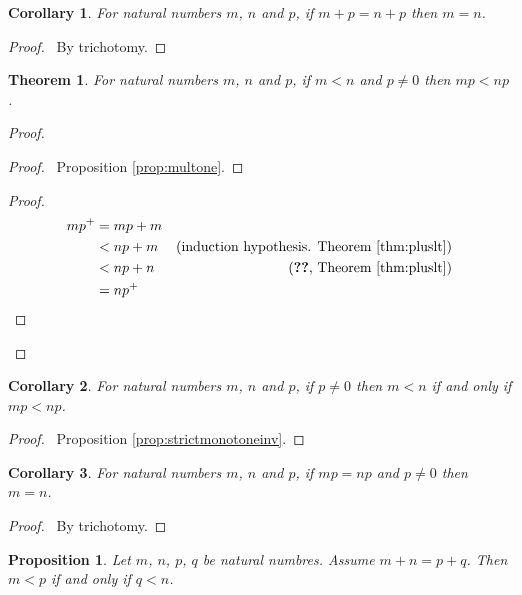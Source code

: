 \documentclass{book}
\let\qed\relax
\newtheorem{prop}[ax]{Proposition}
\newtheorem{cor}{Corollary}[ax]
\newtheorem{thm}[ax]{Theorem}
\theoremstyle{definition}
\begin{document}
\begin{cor}
\label{cor:pluscancel}
For natural numbers $m$, $n$ and $p$, if $m + p = n + p$ then $m = n$.
\end{cor}

\begin{proof}
\pf\ By trichotomy. \qed
\end{proof}

\begin{thm}
For natural numbers $m$, $n$ and $p$, if $m < n$ and $p \neq 0$ then $mp < np$.
\end{thm}

\begin{proof}
\pf
{}
\begin{proof}
	\pf\ Proposition \ref{prop:multone}.
\end{proof}
\begin{proof}
	\pf
	\begin{align*}
		mp^+ & = mp + m \\
		& < np + m & (\text{induction hypothesis. Theorem \ref{thm:pluslt}}) \\
		& < np + n & (\text{\stepref{2}, Theorem \ref{thm:pluslt}}) \\
		& = np^+
	\end{align*}
\end{proof}
\qed
\end{proof}

\begin{cor}
For natural numbers $m$, $n$ and $p$, if $p \neq 0$ then $m < n$ if and only if $mp < np$.
\end{cor}

\begin{proof}
	\pf\ Proposition \ref{prop:strictmonotoneinv}. \qed
\end{proof}

\begin{cor}
For natural numbers $m$, $n$ and $p$, if $mp = np$ and $p \neq 0$ then $m = n$.
\end{cor}

\begin{proof}
	\pf\ By trichotomy. \qed
\end{proof}

\begin{prop}
Let $m$, $n$, $p$, $q$ be natural numbres. Assume $m + n = p + q$. Then $m < p$ if and only if $q < n$.
\end{prop}
\end{document}
